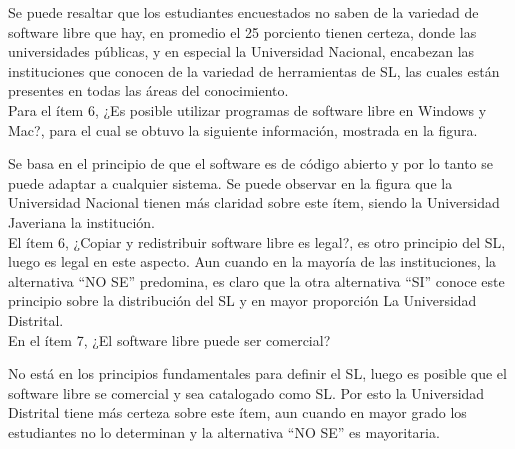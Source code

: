 \begin{multicols}{2}
Se puede resaltar que los estudiantes encuestados no saben de la variedad de software libre que hay, en promedio el 25 porciento tienen certeza, donde las universidades públicas, y en especial la Universidad Nacional,  encabezan las instituciones que conocen de la variedad de herramientas de SL, las cuales están presentes en todas las áreas del conocimiento.\\

Para el \'item 6, ¿Es posible utilizar programas de software libre en Windows y Mac?, para el cual se obtuvo la siguiente información, mostrada en la figura.\\

\begin{center}
\end{center}

Se basa en el principio de que el software es de c\'odigo abierto y por lo tanto se puede adaptar a cualquier sistema. Se puede observar en la figura que la Universidad Nacional tienen m\'as claridad sobre este \'item, siendo la Universidad Javeriana la instituci\'on. \\

El \'item 6, ¿Copiar y redistribuir software libre es legal?, es otro principio del SL, luego es legal en este aspecto. Aun cuando en la mayor\'ia de las instituciones, la alternativa “NO SE” predomina, es claro que la otra alternativa “SI” conoce este principio sobre la distribuci\'on del SL y en mayor proporci\'on La Universidad Distrital.\\
En el \'item 7, ¿El software libre puede ser comercial?


\begin{center}
\end{center}

No est\'a en los principios fundamentales para definir el SL, luego es posible que el software libre se comercial y sea catalogado como SL. Por esto la Universidad Distrital tiene m\'as certeza sobre este \'item, aun cuando en mayor grado los estudiantes no lo determinan y la alternativa “NO SE” es mayoritaria.\\


\end{multicols}
